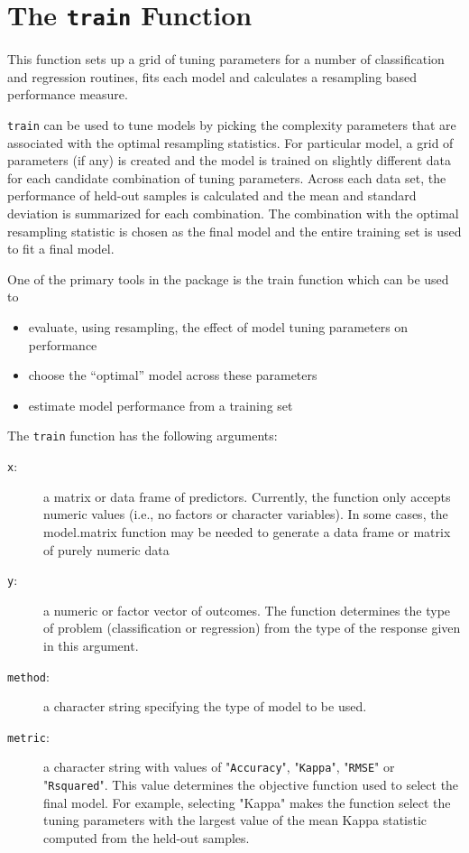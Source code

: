 \documentclass[caret-main.tex]{subfiles}
\begin{document}
\section{The \texttt{train} Function}
This function sets up a grid of tuning parameters for a number of classification and regression routines, fits each model and calculates a resampling based performance measure.


\texttt{train} can be used to tune models by picking the complexity parameters that are associated with the optimal resampling statistics. For particular model, a grid of parameters (if any) is created and the model is trained on slightly different data for each candidate combination of tuning parameters. Across each data set, the performance of held-out samples is calculated and the mean and standard deviation is summarized for each combination. The combination with the optimal resampling statistic is chosen as the final model and the entire training set is used to fit a final model.



One of the primary tools in the package is the train function which can be used to

\begin{itemize}
\item evaluate, using resampling, the eﬀect of model tuning parameters on performance
\item choose the “optimal” model across these parameters
\item estimate model performance from a training set
\end{itemize}



The \texttt{train} function has the following arguments:
\begin{description}
\item[\texttt{x}:] a matrix or data frame of predictors. Currently, the function only accepts numeric
values (i.e., no factors or character variables). In some cases, the model.matrix function
may be needed to generate a data frame or matrix of purely numeric data
\item[\texttt{y}:] a numeric or factor vector of outcomes. The function determines the type of problem
(classification or regression) from the type of the response given in this argument.
\item[\texttt{method}:] a character string specifying the type of model to be used.
\item[\texttt{metric}:] a character string with values of "\texttt{Accuracy}", "\texttt{Kappa}", "\texttt{RMSE}" or "\texttt{Rsquared}".
This value determines the objective function used to select the final model. For example,
selecting "Kappa" makes the function select the tuning parameters with the largest value
of the mean Kappa statistic computed from the held-out samples.
\end{description}
\end{document}
